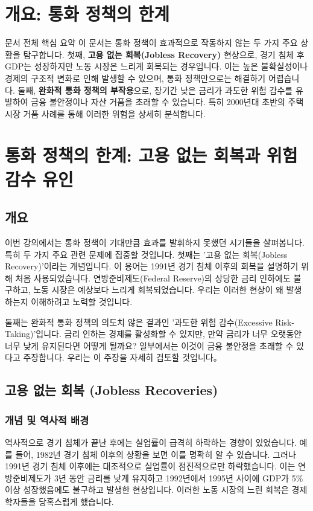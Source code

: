 \documentclass[11pt,a4paper]{article}
\theoremstyle{definition}
\begin{document}
\newpage

\newpage
\section{개요: 통화 정책의 한계}

\begin{summarybox}{문서 전체 핵심 요약}
이 문서는 통화 정책이 효과적으로 작동하지 않는 두 가지 주요 상황을 탐구합니다.
첫째, \textbf{고용 없는 회복(Jobless Recovery)} 현상으로, 경기 침체 후 GDP는 성장하지만 노동 시장은 느리게 회복되는 경우입니다.
이는 높은 불확실성이나 경제의 구조적 변화로 인해 발생할 수 있으며, 통화 정책만으로는 해결하기 어렵습니다.
둘째, \textbf{완화적 통화 정책의 부작용}으로, 장기간 낮은 금리가 과도한 위험 감수를 유발하여 금융 불안정이나 자산 거품을 초래할 수 있습니다.
특히 2000년대 초반의 주택 시장 거품 사례를 통해 이러한 위험을 상세히 분석합니다.
\end{summarybox}

\newpage
\section{통화 정책의 한계: 고용 없는 회복과 위험 감수 유인}

\subsection{개요}
이번 강의에서는 통화 정책이 기대만큼 효과를 발휘하지 못했던 시기들을 살펴봅니다. 특히 두 가지 주요 관련 문제에 집중할 것입니다. 첫째는 '고용 없는 회복(Jobless Recovery)'이라는 개념입니다. 이 용어는 1991년 경기 침체 이후의 회복을 설명하기 위해 처음 사용되었습니다. 연방준비제도(Federal Reserve)의 상당한 금리 인하에도 불구하고, 노동 시장은 예상보다 느리게 회복되었습니다. 우리는 이러한 현상이 왜 발생하는지 이해하려고 노력할 것입니다.

둘째는 완화적 통화 정책의 의도치 않은 결과인 '과도한 위험 감수(Excessive Risk-Taking)'입니다. 금리 인하는 경제를 활성화할 수 있지만, 만약 금리가 너무 오랫동안 너무 낮게 유지된다면 어떻게 될까요? 일부에서는 이것이 금융 불안정을 초래할 수 있다고 주장합니다. 우리는 이 주장을 자세히 검토할 것입니다。

\subsection{고용 없는 회복 (Jobless Recoveries)}

\subsubsection{개념 및 역사적 배경}
역사적으로 경기 침체가 끝난 후에는 실업률이 급격히 하락하는 경향이 있었습니다. 예를 들어, 1982년 경기 침체 이후의 상황을 보면 이를 명확히 알 수 있습니다. 그러나 1991년 경기 침체 이후에는 대조적으로 실업률이 점진적으로만 하락했습니다. 이는 연방준비제도가 3년 동안 금리를 낮게 유지하고 1992년에서 1995년 사이에 GDP가 5\% 이상 성장했음에도 불구하고 발생한 현상입니다. 이러한 노동 시장의 느린 회복은 경제학자들을 당혹스럽게 했습니다.
\end{document}
